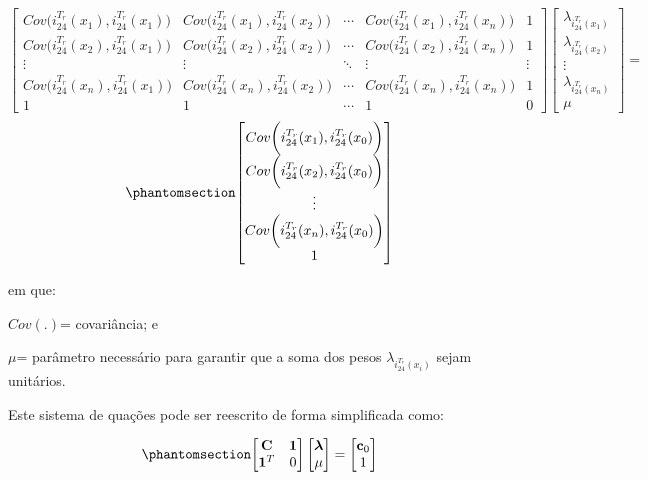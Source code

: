 \documentclass[
]{agujournal2019}
\begin{document}
\[
\begin{bmatrix}
Cov\bigg(i_{24}^{T_r}(x_1), i_{24}^{T_r}(x_1)\bigg) & Cov\bigg(i_{24}^{T_r}(x_1), i_{24}^{T_r}(x_2)\bigg) & \cdots & Cov\bigg(i_{24}^{T_r}(x_1), i_{24}^{T_r}(x_n)\bigg) & 1 \\
Cov\bigg(i_{24}^{T_r}(x_2), i_{24}^{T_r}(x_1)\bigg) & Cov\bigg(i_{24}^{T_r}(x_2), i_{24}^{T_r}(x_2)\bigg) & \cdots & Cov\bigg(i_{24}^{T_r}(x_2), i_{24}^{T_r}(x_n)\bigg) & 1 \\
\vdots & \vdots & \ddots & \vdots & \vdots \\
Cov\bigg(i_{24}^{T_r}(x_n), i_{24}^{T_r}(x_1)\bigg) & Cov\bigg(i_{24}^{T_r}(x_n), i_{24}^{T_r}(x_2)\bigg) & \cdots & Cov\bigg(i_{24}^{T_r}(x_n), i_{24}^{T_r}(x_n)\bigg) & 1 \\
1 & 1 & \cdots & 1 & 0
\end{bmatrix}
\begin{bmatrix}
\lambda_{i_{24}^{T_r}(x_1)} \\
\lambda_{i_{24}^{T_r}(x_2)} \\
\vdots \\
\lambda_{i_{24}^{T_r}(x_n)} \\
\mu
\end{bmatrix}
=
\] \begin{equation}\phantomsection\label{eq-Eq7}{
\begin{bmatrix}
Cov\bigg(i_{24}^{T_r}(x_1), i_{24}^{T_r}(x_0)\bigg) \\
Cov\bigg(i_{24}^{T_r}(x_2), i_{24}^{T_r}(x_0)\bigg) \\
\vdots \\
Cov\bigg(i_{24}^{T_r}(x_n), i_{24}^{T_r}(x_0)\bigg) \\
1
\end{bmatrix}
}\end{equation}

em que:

\(Cov(.)\)= covariância; e

\(\mu\)= parâmetro necessário para garantir que a soma dos pesos
\(\lambda_{i_{24}^{T_r}(x_i)}\) sejam unitários.

Este sistema de quações pode ser reescrito de forma simplificada como:

\begin{equation}\phantomsection\label{eq-Eq8}{
\begin{bmatrix}
\mathbf{C} & \mathbf{1} \\
\mathbf{1}^T & 0
\end{bmatrix}
\begin{bmatrix}
\boldsymbol{\lambda} \\
\mu
\end{bmatrix}
=
\begin{bmatrix}
\mathbf{c}_0 \\
1
\end{bmatrix}
}\end{equation}
\end{document}
